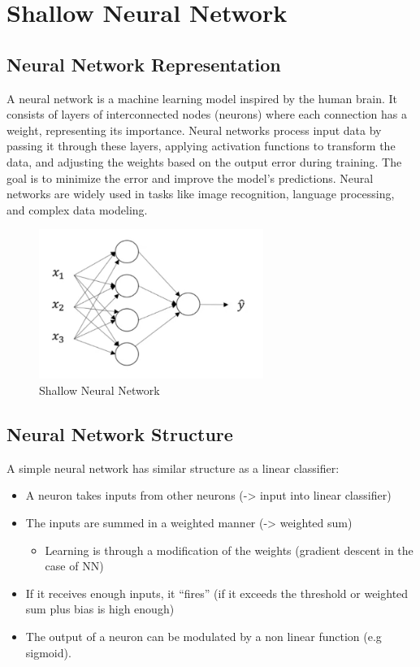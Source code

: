 \documentclass[letterpaper,12pt,notitlepage,twoside]{report}
\begin{document}
\section{Shallow Neural Network}
\subsection{Neural Network Representation}
A neural network is a machine learning model inspired by the human brain. It consists of layers of interconnected nodes (neurons) where each connection has a weight, representing its importance. Neural networks process input data by passing it through these layers, applying activation functions to transform the data, and adjusting the weights based on the output error during training. The goal is to minimize the error and improve the model's predictions. Neural networks are widely used in tasks like image recognition, language processing, and complex data modeling.

\begin{figure}[h]
	\centering
	\includegraphics[width=0.65\textwidth]{Images/Shallow Neural Network.png}
	\caption{Shallow Neural Network}
	\label{fig:11}
\end{figure}

\subsection{Neural Network Structure}
A simple neural network has similar structure as a linear classifier:
\begin{itemize}[nosep]
\item A neuron takes inputs from other neurons (-> input into linear classifier)
\item The inputs are summed in a weighted manner (-> weighted sum)
	\begin{itemize}[label={}]
		\item Learning is through a modification of the weights (gradient descent in the case of NN)
	\end{itemize}
\item If it receives enough inputs, it “fires” (if it exceeds the threshold or weighted sum plus bias is high enough)
\item The output of a neuron can be modulated by a non linear function (e.g sigmoid).
\end{itemize}
\end{document}
